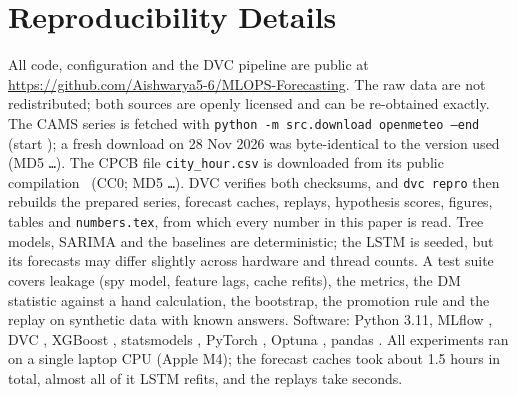 \documentclass[conference]{IEEEtran}
\begin{document}
\section{Reproducibility Details}
\label{app:repro}
All code, configuration and the DVC pipeline are public at
\url{https://github.com/Aishwarya5-6/MLOPS-Forecasting}. The raw data are not redistributed; both
sources are openly licensed and can be re-obtained exactly. The CAMS series is fetched with
\texttt{python -m src.download openmeteo --end } (start ); a
fresh download on 28 Nov 2026 was byte-identical to the version used (MD5
\texttt{\ldots}). The CPCB file \texttt{city\_hour.csv} is downloaded from its public
compilation~\cite{rao2020kaggle} (CC0; MD5 \texttt{\ldots}). DVC verifies both
checksums, and \texttt{dvc repro} then rebuilds the prepared series, forecast caches, replays,
hypothesis scores, figures, tables and \texttt{numbers.tex}, from which every number in this paper
is read. Tree models, SARIMA and the baselines are deterministic; the LSTM is seeded, but its
forecasts may differ slightly across hardware and thread counts. A test suite covers leakage (spy model, feature lags, cache refits), the
metrics, the DM statistic against a hand calculation, the bootstrap, the promotion rule and the
replay on synthetic data with known answers. Software: Python 3.11, MLflow ,
DVC , XGBoost , statsmodels , PyTorch
, Optuna , pandas . All experiments ran on a single
laptop CPU (Apple M4); the forecast caches took about 1.5 hours in total, almost all of it LSTM
refits, and the replays take seconds.
\fi

\FloatBarrier



\end{document}
